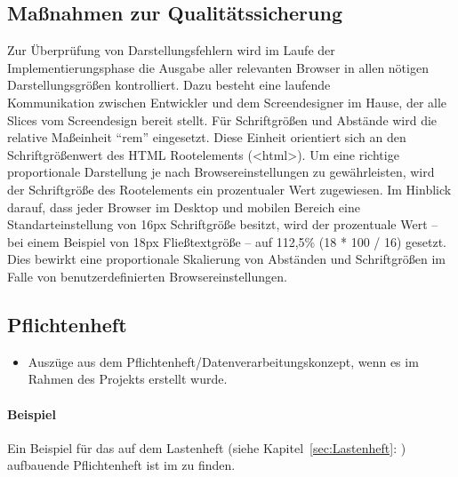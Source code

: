\subsection{Maßnahmen zur Qualitätssicherung}
\label{sec:Qualitaetssicherung}
Zur Überprüfung von Darstellungsfehlern wird im Laufe der
Implementierungsphase die Ausgabe aller relevanten Browser in allen nötigen
Darstellungsgrößen kontrolliert. Dazu besteht eine laufende \\ Kommunikation
zwischen Entwickler und dem Screendesigner im Hause, der alle Slices vom
Screendesign bereit stellt.
Für Schriftgrößen und Abstände wird die relative Maßeinheit "`rem"' eingesetzt.
Diese Einheit orientiert sich an den Schriftgrößenwert des HTML
Rootelements (<html>). Um eine richtige proportionale Darstellung je nach
Browsereinstellungen zu gewährleisten, wird der Schriftgröße des Rootelements
ein prozentualer Wert zugewiesen. Im Hinblick darauf, dass jeder Browser im
Desktop und mobilen Bereich eine Standarteinstellung von 16px Schriftgröße
besitzt, wird der prozentuale Wert -- bei einem Beispiel von 18px
Fließtextgröße -- auf 112,5\% (18 * 100 / 16) gesetzt. Dies bewirkt eine
proportionale Skalierung von Abständen und Schriftgrößen im Falle von
benutzerdefinierten Browsereinstellungen.


\subsection{Pflichtenheft}
\label{sec:Pflichtenheft}
\begin{itemize}
	\item Auszüge aus dem Pflichtenheft/Datenverarbeitungskonzept, wenn es im Rahmen des Projekts erstellt wurde.
\end{itemize}

\paragraph{Beispiel}
Ein Beispiel für das auf dem Lastenheft (siehe Kapitel~\ref{sec:Lastenheft}: ) aufbauende Pflichtenheft ist im  zu finden.


